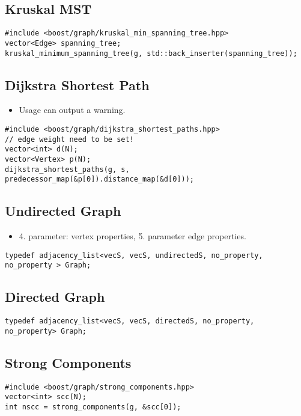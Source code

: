 \documentclass[11pt]{article}
\begin{document}
\subsection{Kruskal MST}
\begin{lstlisting}
#include <boost/graph/kruskal_min_spanning_tree.hpp>
vector<Edge> spanning_tree;
kruskal_minimum_spanning_tree(g, std::back_inserter(spanning_tree));
\end{lstlisting}

\subsection{Dijkstra Shortest Path}
\begin{itemize}
  \item Usage can output a warning.
\end{itemize}

\begin{lstlisting}
#include <boost/graph/dijkstra_shortest_paths.hpp>
// edge weight need to be set!
vector<int> d(N);
vector<Vertex> p(N);
dijkstra_shortest_paths(g, s, predecessor_map(&p[0]).distance_map(&d[0]));
\end{lstlisting}

\subsection{Undirected Graph}
\begin{itemize}
  \item 4. parameter: vertex properties, 5. parameter edge properties.
\end{itemize}
\begin{lstlisting}
typedef adjacency_list<vecS, vecS, undirectedS, no_property, no_property > Graph;
\end{lstlisting}

\subsection{Directed Graph}
\begin{lstlisting}
typedef adjacency_list<vecS, vecS, directedS, no_property, no_property> Graph;
\end{lstlisting}

\subsection{Strong Components}
\begin{lstlisting}
#include <boost/graph/strong_components.hpp>
vector<int> scc(N);
int nscc = strong_components(g, &scc[0]);
\end{lstlisting}
\end{document}
